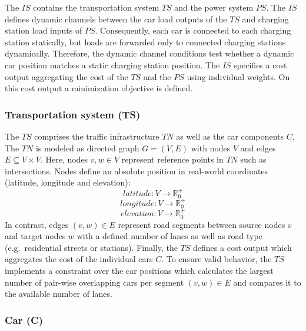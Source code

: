 The $IS$ contains the transportation system $TS$ and the power system $PS$. The $IS$ defines dynamic channels between the car load outputs of the $TS$ and charging station load inputs of $PS$. Consequently, each car is connected to each charging station statically, but loads are forwarded only to connected charging stations dynamically. Therefore, the dynamic channel conditions test whether a dynamic car position matches a static charging station position. The $IS$ specifies a cost output aggregating the cost of the $TS$ and the $PS$ using individual weights. On this cost output a minimization objective is defined.

\subsubsection*{Transportation system (TS)}

The $TS$ comprises the traffic infrastructure $TN$ as well as the car components $C$. The $TN$ is modeled as directed graph $G = (V,E)$ with nodes $V$ and edges $E \subseteq V \times V$. Here, nodes $v,w \in V$ represent reference points in $TN$ such as intersections. Nodes define an absolute position in real-world coordinates (latitude, longitude and elevation): 
$$\mathit{latitude}: V \to \mathbb{R}_0^+$$ 
$$\mathit{longitude}: V \to \mathbb{R}_0^+$$ 
$$\mathit{elevation}: V \to \mathbb{R}_0^+$$ 
In contrast, edges $(v,w) \in E$ represent road segments between source nodes $v$ and target nodes $w$ with a defined number of lanes as well as road type (e.g.\ residential streets or stations). Finally, the $TS$ defines a cost output which aggregates the cost of the individual cars $C$. To ensure valid behavior, the $TS$ implements a constraint over the car positions which calculates the largest number of pair-wise overlapping cars per segment $(v,w) \in E$ and compares it to the available number of lanes.

\subsubsection*{Car (C)}
\label{section:car}

